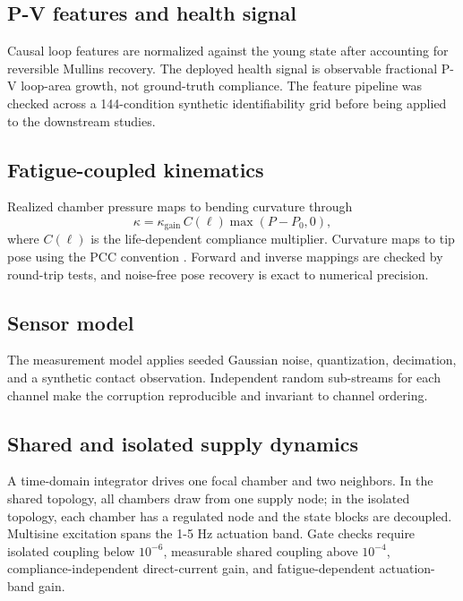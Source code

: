 \documentclass[preprints,article,submit,oneauthor]{Definitions/mdpi}
\begin{document}
\subsection{P-V features and health signal}

Causal loop features are normalized against the young state after accounting for reversible Mullins recovery. The deployed health signal is observable fractional P-V loop-area growth, not ground-truth compliance. The feature pipeline was checked across a 144-condition synthetic identifiability grid before being applied to the downstream studies.

\subsection{Fatigue-coupled kinematics}

Realized chamber pressure maps to bending curvature through
\begin{equation}
\kappa=\kappa_{\mathrm{gain}}\,C(\ell)\max(P-P_0,0),
\end{equation}
where $C(\ell)$ is the life-dependent compliance multiplier. Curvature maps to tip pose using the PCC convention \citep{webster2010}. Forward and inverse mappings are checked by round-trip tests, and noise-free pose recovery is exact to numerical precision.

\subsection{Sensor model}

The measurement model applies seeded Gaussian noise, quantization, decimation, and a synthetic contact observation. Independent random sub-streams for each channel make the corruption reproducible and invariant to channel ordering.

\subsection{Shared and isolated supply dynamics}

A time-domain integrator drives one focal chamber and two neighbors. In the shared topology, all chambers draw from one supply node; in the isolated topology, each chamber has a regulated node and the state blocks are decoupled. Multisine excitation spans the 1-5 Hz actuation band. Gate checks require isolated coupling below $10^{-6}$, measurable shared coupling above $10^{-4}$, compliance-independent direct-current gain, and fatigue-dependent actuation-band gain.
\end{document}
